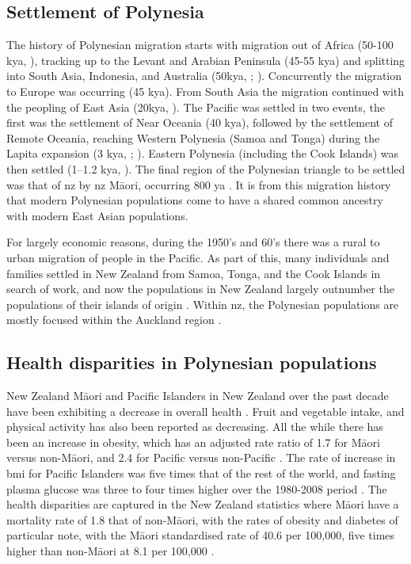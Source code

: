 \documentclass[]{report}
\newcommand{\tex}[1]{#1}
\begin{document}
\subsection{Settlement of Polynesia}\label{settlement-of-polynesia-1}

The history of Polynesian migration starts with migration out of Africa
(50-100 kya, \citet{Nielsen2017}), tracking up to the Levant and Arabian
Peninsula (45-55 kya) and splitting into South Asia, Indonesia, and
Australia (50kya, \citet{Kivisild1999}; \citet{Quintana-Murci1999}).
Concurrently the migration to Europe was occurring (45 kya). From South
Asia the migration continued with the peopling of East Asia (20kya,
\citet{Groucutt2015}). The Pacific was settled in two events, the first
was the settlement of Near Oceania (40 kya), followed by the settlement
of Remote Oceania, reaching Western Polynesia (Samoa and Tonga) during
the Lapita expansion (3 kya, \citet{Matisoo-Smith2015};
\citet{Skoglund2016}). Eastern Polynesia (including the Cook Islands)
was then settled (1--1.2 kya, \citet{Wilmshurst2011}). The final region
of the Polynesian triangle to be settled was that of \gls{nz} by
\gls{nz} M\tex{\={a}}ori, occurring 800 ya
\citep{Duggan2014, Matisoo-Smith2015}. It is from this migration history
that modern Polynesian populations come to have a shared common ancestry
with modern East Asian populations.

For largely economic reasons, during the 1950's and 60's there was a
rural to urban migration of people in the Pacific. As part of this, many
individuals and families settled in New Zealand from Samoa, Tonga, and
the Cook Islands in search of work, and now the populations in New
Zealand largely outnumber the populations of their islands of origin
\citep{MatisooSmith2012highway}. Within \gls{nz}, the Polynesian
populations are mostly focused within the Auckland region
\citep{Barcham2009}.

\subsection{Health disparities in Polynesian
populations}\label{health-disparities-in-polynesian-populations}

New Zealand M\tex{\={a}}ori and Pacific Islanders in New Zealand over
the past decade have been exhibiting a decrease in overall health
\citep{MinistryofHealth2016}. Fruit and vegetable intake, and physical
activity has also been reported as decreasing. All the while there has
been an increase in obesity, which has an adjusted rate ratio of 1.7 for
M\tex{\={a}}ori versus non-M\tex{\={a}}ori, and 2.4 for Pacific versus
non-Pacific \citep{MinistryofHealth2016}. The rate of increase in
\gls{bmi} for Pacific Islanders was five times that of the rest of the
world, and fasting plasma glucose was three to four times higher over
the 1980-2008 period \citep{Hawley2015}. The health disparities are
captured in the New Zealand statistics where M\tex{\={a}}ori have a
mortality rate of 1.8 that of non-M\tex{\={a}}ori, with the rates of
obesity and diabetes of particular note, with the M\tex{\={a}}ori
standardised rate of 40.6 per 100,000, five times higher than
non-M\tex{\={a}}ori at 8.1 per 100,000 \citep{MinistryofHealth2012}.
\end{document}
